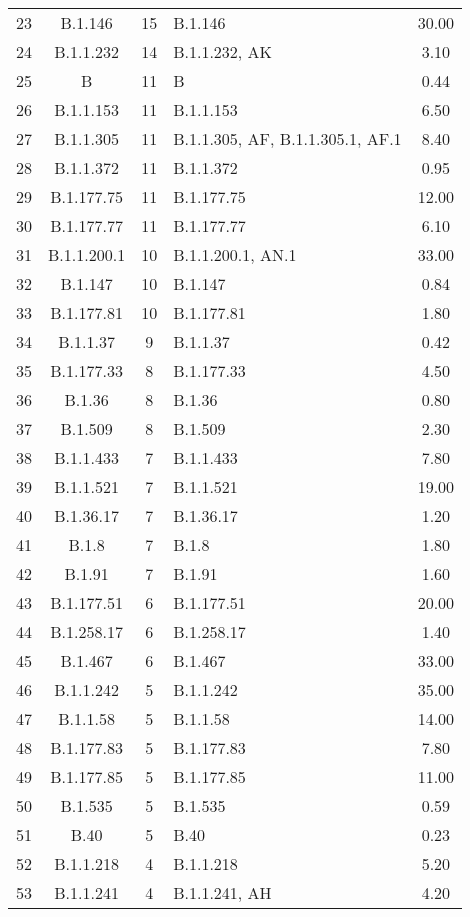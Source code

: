 \begin{longtable}{cccP{4cm}c}
  23 & B.1.146 &  15 & B.1.146 & 30.00 \\ 
  24 & B.1.1.232 &  14 & B.1.1.232, AK & 3.10 \\ 
  25 & B &  11 & B & 0.44 \\ 
  26 & B.1.1.153 &  11 & B.1.1.153 & 6.50 \\ 
  27 & B.1.1.305 &  11 & B.1.1.305, AF, B.1.1.305.1, AF.1 & 8.40 \\ 
  28 & B.1.1.372 &  11 & B.1.1.372 & 0.95 \\ 
  29 & B.1.177.75 &  11 & B.1.177.75 & 12.00 \\ 
  30 & B.1.177.77 &  11 & B.1.177.77 & 6.10 \\ 
  31 & B.1.1.200.1 &  10 & B.1.1.200.1, AN.1 & 33.00 \\ 
  32 & B.1.147 &  10 & B.1.147 & 0.84 \\ 
  33 & B.1.177.81 &  10 & B.1.177.81 & 1.80 \\ 
  34 & B.1.1.37 &   9 & B.1.1.37 & 0.42 \\ 
  35 & B.1.177.33 &   8 & B.1.177.33 & 4.50 \\ 
  36 & B.1.36 &   8 & B.1.36 & 0.80 \\ 
  37 & B.1.509 &   8 & B.1.509 & 2.30 \\ 
  38 & B.1.1.433 &   7 & B.1.1.433 & 7.80 \\ 
  39 & B.1.1.521 &   7 & B.1.1.521 & 19.00 \\ 
  40 & B.1.36.17 &   7 & B.1.36.17 & 1.20 \\ 
  41 & B.1.8 &   7 & B.1.8 & 1.80 \\ 
  42 & B.1.91 &   7 & B.1.91 & 1.60 \\ 
  43 & B.1.177.51 &   6 & B.1.177.51 & 20.00 \\ 
  44 & B.1.258.17 &   6 & B.1.258.17 & 1.40 \\ 
  45 & B.1.467 &   6 & B.1.467 & 33.00 \\ 
  46 & B.1.1.242 &   5 & B.1.1.242 & 35.00 \\ 
  47 & B.1.1.58 &   5 & B.1.1.58 & 14.00 \\ 
  48 & B.1.177.83 &   5 & B.1.177.83 & 7.80 \\ 
  49 & B.1.177.85 &   5 & B.1.177.85 & 11.00 \\ 
  50 & B.1.535 &   5 & B.1.535 & 0.59 \\ 
  51 & B.40 &   5 & B.40 & 0.23 \\ 
  52 & B.1.1.218 &   4 & B.1.1.218 & 5.20 \\ 
  53 & B.1.1.241 &   4 & B.1.1.241, AH & 4.20 \\ 

\end{longtable}
